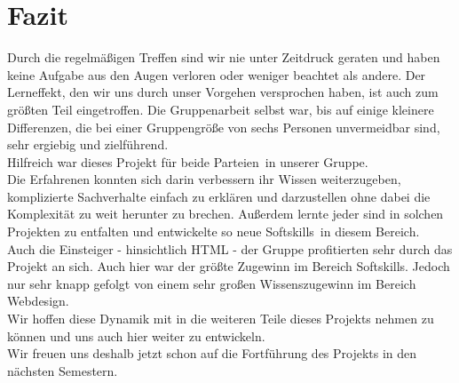 \documentclass[12pt,a4paper]{article}
\begin{document}
\section{Fazit}
Durch die regelmäßigen Treffen sind wir nie unter Zeitdruck geraten und haben keine Aufgabe aus den Augen verloren oder weniger beachtet als andere. Der Lerneffekt, den wir uns durch unser Vorgehen versprochen haben, ist auch zum größten Teil eingetroffen.
Die Gruppenarbeit selbst war, bis auf einige kleinere Differenzen, die bei einer Gruppengröße von sechs Personen unvermeidbar sind, sehr ergiebig und zielführend.\\
Hilfreich war dieses Projekt für beide \dq Parteien\dq \ in unserer Gruppe.\\
Die Erfahrenen konnten sich darin verbessern ihr Wissen weiterzugeben, komplizierte Sachverhalte einfach zu erklären und darzustellen ohne dabei die Komplexität zu weit herunter zu brechen. Außerdem lernte jeder sind in solchen Projekten zu entfalten und entwickelte so neue \dq Softskills\dq \ in diesem Bereich.\\
Auch die Einsteiger - hinsichtlich HTML - der Gruppe profitierten sehr durch das Projekt an sich. Auch hier war der größte Zugewinn im Bereich \dq Softskills\dq . Jedoch nur sehr knapp gefolgt von einem sehr großen Wissenszugewinn im Bereich Webdesign.\\
Wir hoffen diese Dynamik mit in die weiteren Teile dieses Projekts nehmen zu können und uns auch hier weiter zu entwickeln.\\
Wir freuen uns deshalb jetzt schon auf die Fortführung des Projekts in den nächsten Semestern.
\end{document}
